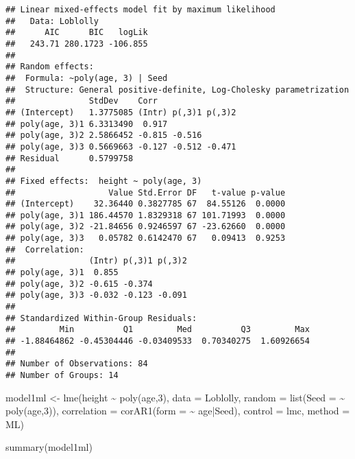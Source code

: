 \documentclass[
]{book}
\newenvironment{Shaded}{\begin{snugshade}}{\end{snugshade}}
\newcommand{\AttributeTok}[1]{\textcolor[rgb]{0.77,0.63,0.00}{#1}}
\newcommand{\DecValTok}[1]{\textcolor[rgb]{0.00,0.00,0.81}{#1}}
\newcommand{\FunctionTok}[1]{\textcolor[rgb]{0.00,0.00,0.00}{#1}}
\newcommand{\NormalTok}[1]{#1}
\newcommand{\OtherTok}[1]{\textcolor[rgb]{0.56,0.35,0.01}{#1}}
\newcommand{\SpecialCharTok}[1]{\textcolor[rgb]{0.00,0.00,0.00}{#1}}
\newcommand{\StringTok}[1]{\textcolor[rgb]{0.31,0.60,0.02}{#1}}
\begin{document}
\begin{verbatim}
## Linear mixed-effects model fit by maximum likelihood
##   Data: Loblolly 
##      AIC      BIC   logLik
##   243.71 280.1723 -106.855
## 
## Random effects:
##  Formula: ~poly(age, 3) | Seed
##  Structure: General positive-definite, Log-Cholesky parametrization
##               StdDev    Corr                
## (Intercept)   1.3775085 (Intr) p(,3)1 p(,3)2
## poly(age, 3)1 6.3313490  0.917              
## poly(age, 3)2 2.5866452 -0.815 -0.516       
## poly(age, 3)3 0.5669663 -0.127 -0.512 -0.471
## Residual      0.5799758                     
## 
## Fixed effects:  height ~ poly(age, 3) 
##                   Value Std.Error DF   t-value p-value
## (Intercept)    32.36440 0.3827785 67  84.55126  0.0000
## poly(age, 3)1 186.44570 1.8329318 67 101.71993  0.0000
## poly(age, 3)2 -21.84656 0.9246597 67 -23.62660  0.0000
## poly(age, 3)3   0.05782 0.6142470 67   0.09413  0.9253
##  Correlation: 
##               (Intr) p(,3)1 p(,3)2
## poly(age, 3)1  0.855              
## poly(age, 3)2 -0.615 -0.374       
## poly(age, 3)3 -0.032 -0.123 -0.091
## 
## Standardized Within-Group Residuals:
##         Min          Q1         Med          Q3         Max 
## -1.88464862 -0.45304446 -0.03409533  0.70340275  1.60926654 
## 
## Number of Observations: 84
## Number of Groups: 14
\end{verbatim}

\begin{Shaded}
\begin{Highlighting}[]
\NormalTok{model1ml }\OtherTok{\textless{}{-}} \FunctionTok{lme}\NormalTok{(height }\SpecialCharTok{\textasciitilde{}} \FunctionTok{poly}\NormalTok{(age,}\DecValTok{3}\NormalTok{), }\AttributeTok{data =}\NormalTok{ Loblolly,}
\AttributeTok{random =} \FunctionTok{list}\NormalTok{(}\AttributeTok{Seed =} \SpecialCharTok{\textasciitilde{}} \FunctionTok{poly}\NormalTok{(age,}\DecValTok{3}\NormalTok{)),}
\AttributeTok{correlation =} \FunctionTok{corAR1}\NormalTok{(}\AttributeTok{form =} \SpecialCharTok{\textasciitilde{}}\NormalTok{ age}\SpecialCharTok{|}\NormalTok{Seed), }\AttributeTok{control =}\NormalTok{ lmc, }\AttributeTok{method =} \StringTok{\textquotesingle{}ML\textquotesingle{}}\NormalTok{)}

\FunctionTok{summary}\NormalTok{(model1ml)}
\end{Highlighting}
\end{Shaded}
\end{document}
